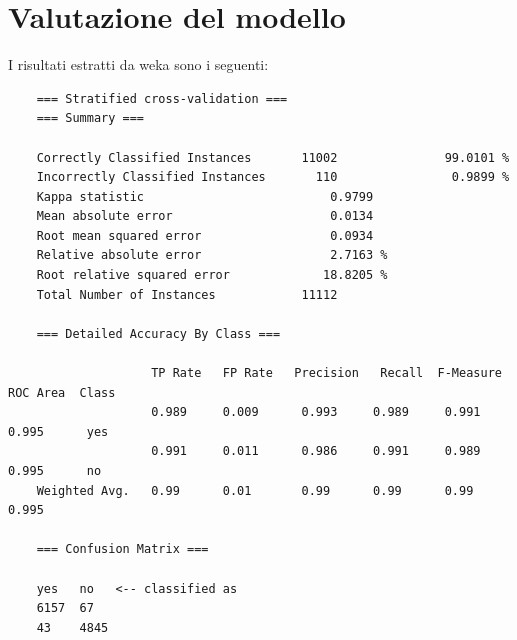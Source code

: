 \section{Valutazione del modello}
\label{Risultati}
I risultati estratti da weka sono i seguenti: 
{\footnotesize
\begin{verbatim}
	=== Stratified cross-validation ===
	=== Summary ===
	
	Correctly Classified Instances       11002               99.0101 %
	Incorrectly Classified Instances       110                0.9899 %
	Kappa statistic                          0.9799
	Mean absolute error                      0.0134
	Root mean squared error                  0.0934
	Relative absolute error                  2.7163 %
	Root relative squared error             18.8205 %
	Total Number of Instances            11112     
	
	=== Detailed Accuracy By Class ===
	
	                TP Rate   FP Rate   Precision   Recall  F-Measure   ROC Area  Class
	                0.989     0.009      0.993     0.989     0.991      0.995      yes
	                0.991     0.011      0.986     0.991     0.989      0.995      no
	Weighted Avg.   0.99      0.01       0.99      0.99      0.99       0.995
	
	=== Confusion Matrix ===
	
	yes   no   <-- classified as
	6157  67 
	43    4845
\end{verbatim}
}
